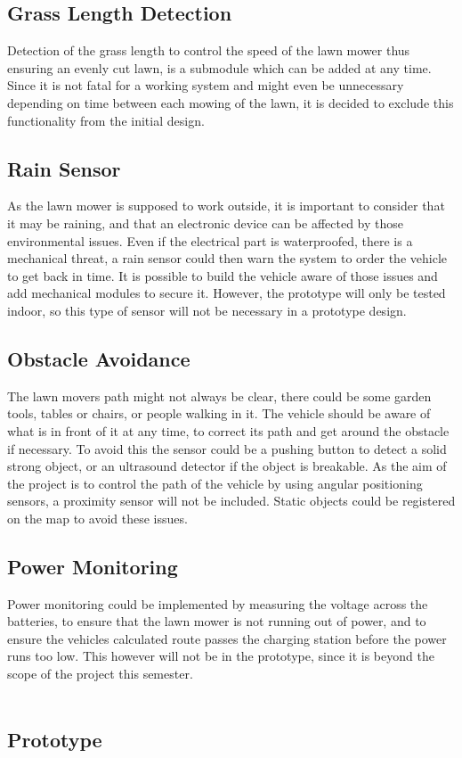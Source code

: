 \subsection{Grass Length Detection}
Detection of the grass length to control the speed of the lawn mower thus ensuring an evenly cut lawn, is a submodule which can be added at any time. Since it is not fatal for a working system and might even be unnecessary depending on time between each mowing of the lawn, it is decided to exclude this functionality from the initial design.

\subsection{Rain Sensor}
As the lawn mower is supposed to work outside, it is important to consider that it may be raining, and that an electronic device can be affected by those environmental issues. Even if the electrical part is waterproofed, there is a mechanical threat, a rain sensor could then warn the system to order the vehicle to get back in time.
It is possible to build the vehicle aware of those issues and add mechanical modules to secure it. However, the prototype will only be tested indoor, so this type of sensor will not be necessary in a prototype design.

\subsection{Obstacle Avoidance}
The lawn movers path might not always be clear, there could be some garden tools, tables or chairs, or people walking in it. The vehicle should be aware of what is in front of it at any time, to correct its path and get around the obstacle if necessary. To avoid this the sensor could be a pushing button to detect a solid strong object, or an ultrasound detector if the object is breakable.
As the aim of the project is to control the path of the vehicle by using angular positioning sensors, a proximity sensor will not be included. Static objects could be registered on the map to avoid these issues.

\subsection{Power Monitoring}
Power monitoring could be implemented by measuring the voltage across the batteries, to ensure that the lawn mower is not running out of power, and to ensure the vehicles calculated route passes the charging station before the power runs too low.
This however will not be in the prototype, since it is beyond the scope of the project this semester.\\\\

\subsection{Prototype}

